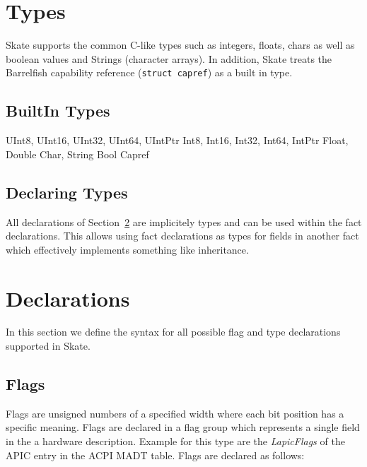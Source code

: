 \documentclass[a4paper,11pt,twoside]{report}
\begin{document}
{{\begin{description}
\end{description}

\section{Types}\label{sec:decl:types}

Skate supports the common C-like types such as integers, floats, chars as well 
as boolean values and Strings (character arrays). In addition, Skate treats
the Barrelfish capability reference (\texttt{struct capref}) as a built in 
type.

\subsection{BuiltIn Types}
\begin{syntax}
UInt8, UInt16, UInt32, UInt64, UIntPtr
Int8, Int16, Int32, Int64, IntPtr
Float, Double
Char, String
Bool
Capref
\end{syntax}

\subsection{Declaring Types}

All declarations of Section~\ref{sec:decl:decls} are implicitely types and can
be used within the fact declarations. This allows using fact declarations as 
types for fields in another fact which effectively implements something like
inheritance. 



\section{Declarations}\label{sec:decl:decls}

In this section we define the syntax for all possible flag and type 
declarations supported in Skate. 

\subsection{Flags}

Flags are unsigned numbers of a specified width where each bit position has a
specific meaning. Flags are declared in a flag group which represents a single
field in the a hardware description. Example for this type are the 
\emph{LapicFlags} of the APIC entry in the ACPI MADT table. Flags are declared 
as follows:

}}
\end{document}
